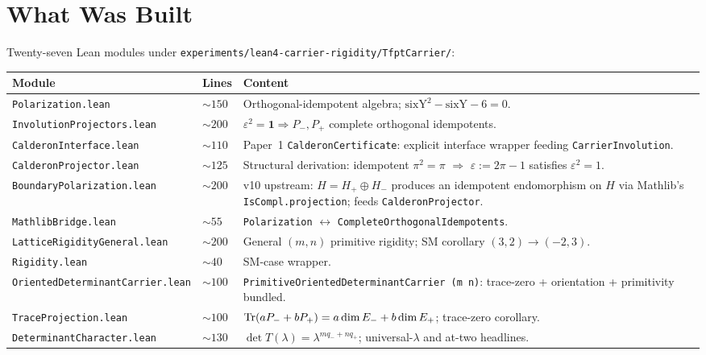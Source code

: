 \documentclass[11pt,a4paper]{article}
\begin{document}
\section{What Was Built}
\label{sec:built}

Twenty-seven Lean modules under
\texttt{experiments/lean4-carrier-rigidity/TfptCarrier/}:

\begin{center}
\footnotesize
\begin{tabularx}{0.98\textwidth}{@{}p{}p{}Y@{}}
\toprule
\textbf{Module} & \textbf{Lines} & \textbf{Content} \\
\midrule
\texttt{Polarization.lean}        & $\sim150$ & Orthogonal-idempotent algebra; $\mathrm{sixY}^2-\mathrm{sixY}-6=0$. \\
\texttt{InvolutionProjectors.lean}& $\sim200$ & $\varepsilon^2=\mathbf 1 \Rightarrow P_-, P_+$ complete orthogonal idempotents. \\
\texttt{CalderonInterface.lean}   & $\sim110$ & Paper~1 \texttt{CalderonCertificate}: explicit interface wrapper feeding \texttt{CarrierInvolution}. \\
\texttt{CalderonProjector.lean}   & $\sim125$ & Structural derivation: idempotent $\pi^2=\pi$ $\Rightarrow$ $\varepsilon := 2\pi-1$ satisfies $\varepsilon^2 = 1$. \\
\texttt{BoundaryPolarization.lean}& $\sim200$ & v10 upstream: $H = H_+ \oplus H_-$ produces an idempotent endomorphism on $H$ via Mathlib's \texttt{IsCompl.projection}; feeds \texttt{CalderonProjector}. \\
\texttt{MathlibBridge.lean}       & $\sim55$  & \texttt{Polarization} $\leftrightarrow$ \texttt{CompleteOrthogonalIdempotents}. \\
\texttt{LatticeRigidityGeneral.lean}&$\sim200$& General $(m,n)$ primitive rigidity; SM corollary $(3,2)\to(-2,3)$. \\
\texttt{Rigidity.lean}            & $\sim40$  & SM-case wrapper. \\
\texttt{OrientedDeterminantCarrier.lean} & $\sim100$ & \texttt{PrimitiveOrientedDeterminantCarrier (m n)}: trace-zero + orientation + primitivity bundled. \\
\texttt{TraceProjection.lean}     & $\sim100$ & $\operatorname{Tr}(aP_-+bP_+) = a\dim E_- + b\dim E_+$; trace-zero corollary. \\
\texttt{DeterminantCharacter.lean}& $\sim130$ & $\det T(\lambda) = \lambda^{m q_-+n q_+}$; universal-$\lambda$ and at-two headlines. \\

\end{tabularx}
\end{center}
\end{document}
